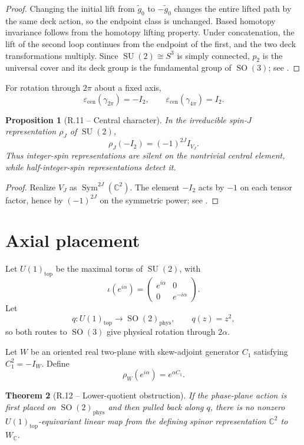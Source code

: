 \documentclass[11pt,letterpaper]{article}
\theoremstyle{returnstyle}
\newtheorem{theorem}{Theorem}[section]
\newtheorem{proposition}[theorem]{Proposition}
\newcommand{\C}{\mathbb{C}}
\newcommand{\SO}{\operatorname{SO}}
\newcommand{\SU}{\operatorname{SU}}
\begin{document}
\begin{proof}
Changing the initial lift from $\widetilde g_0$ to $-\widetilde g_0$ changes the entire lifted path by the same deck action, so the endpoint class is unchanged.  Based homotopy invariance follows from the homotopy lifting property.  Under concatenation, the lift of the second loop continues from the endpoint of the first, and the two deck transformations multiply.  Since $\SU(2)\cong S^3$ is simply connected, $p_2$ is the universal cover and its deck group is the fundamental group of $\SO(3)$; see \cite{Hatcher,Hall}.
\end{proof}

For rotation through $2\pi$ about a fixed axis,
\[
\varepsilon_{\mathrm{cen}}(\gamma_{2\pi})=-I_2,
\qquad
\varepsilon_{\mathrm{cen}}(\gamma_{4\pi})=I_2.
\]

\begin{proposition}[R.11 -- Central character]
In the irreducible spin-$J$ representation $\rho_J$ of $\SU(2)$,
\[
\rho_J(-I_2)=(-1)^{2J}I_{V_J}.
\]
Thus integer-spin representations are silent on the nontrivial central element, while half-integer-spin representations detect it.
\end{proposition}

\begin{proof}
Realize $V_J$ as $\operatorname{Sym}^{2J}(\C^2)$.  The element $-I_2$ acts by $-1$ on each tensor factor, hence by $(-1)^{2J}$ on the symmetric power; see \cite{FultonHarris,Hall}.
\end{proof}

\section{Axial placement}\label{sec:placement}

Let $U(1)_{\mathrm{top}}$ be the maximal torus of $\SU(2)$, with
\[
\iota(e^{i\alpha})=
\begin{pmatrix}
 e^{i\alpha}&0\\
 0&e^{-i\alpha}
\end{pmatrix}.
\]
Let
\[
q:U(1)_{\mathrm{top}}\longrightarrow\SO(2)_{\mathrm{phys}},
\qquad
q(z)=z^2,
\]
so both routes to $\SO(3)$ give physical rotation through $2\alpha$.

Let $W$ be an oriented real two-plane with skew-adjoint generator $C_1$ satisfying $C_1^2=-I_W$.  Define
\[
\rho_W(e^{i\alpha})=e^{\alpha C_1}.
\]

\begin{theorem}[R.12 -- Lower-quotient obstruction]\label{thm:obstruction}
If the phase-plane action is first placed on $\SO(2)_{\mathrm{phys}}$ and then pulled back along $q$, there is no nonzero $U(1)_{\mathrm{top}}$-equivariant linear map from the defining spinor representation $\C^2$ to $W_\C$.
\end{theorem}
\end{document}
